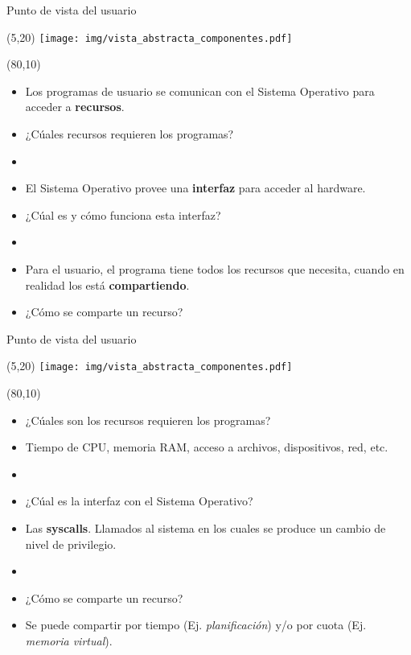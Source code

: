 \documentclass[aspectratio=169]{beamer}
\begin{document}
\begin{frame}{Punto de vista del usuario}
    \begin{textblock}{80}(5,20)
    \texttt{[image: img/vista\_abstracta\_componentes.pdf]}
    \end{textblock}
    \begin{textblock}{70}(80,10)
    \small
    \begin{itemize}
    \item<1->[] Los programas de usuario se comunican con el Sistema Operativo para acceder a \textbf{recursos}.
    \item<1->[] \textcolor{naranjauca}{¿Cúales recursos requieren los programas?}
    \item[] 
    \item<2->[] El Sistema Operativo provee una \textbf{interfaz} para acceder al hardware.
    \item<2->[] \textcolor{naranjauca}{¿Cúal es y cómo funciona esta interfaz?}
    \item[] 
    \item<3->[] Para el usuario, el programa tiene todos los recursos que necesita, cuando en realidad los está \textbf{compartiendo}.
    \item<3->[] \textcolor{naranjauca}{¿Cómo se comparte un recurso?}
    \end{itemize}
    \end{textblock}
\end{frame}

\begin{frame}{Punto de vista del usuario}
    \begin{textblock}{80}(5,20)
    \texttt{[image: img/vista\_abstracta\_componentes.pdf]}
    \end{textblock}
    \begin{textblock}{72}(80,10)
    \small
    \begin{itemize}
    \item<1->[] \textcolor{naranjauca}{¿Cúales son los recursos requieren los programas?}
    \item<1->[] Tiempo de CPU, memoria RAM, acceso a archivos, dispositivos, red, etc.
    \item[] 
    \item<2->[] \textcolor{naranjauca}{¿Cúal es la interfaz con el Sistema Operativo?}
    \item<2->[] Las \textbf{syscalls}. Llamados al sistema en los cuales se produce un cambio de nivel de privilegio.
    \item[] 
    \item<3->[] \textcolor{naranjauca}{¿Cómo se comparte un recurso?}
    \item<3->[] Se puede compartir por tiempo (Ej. \emph{planificación}) y/o por cuota (Ej. \emph{memoria virtual}).
    \end{itemize}
    \end{textblock}
\end{frame}
\end{document}
